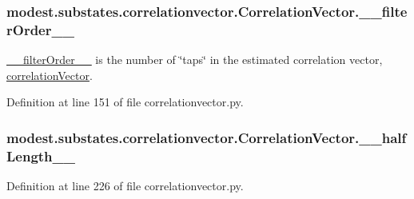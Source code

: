 \subsubsection[{\texorpdfstring{\+\_\+\+\_\+filter\+Order\+\_\+\+\_\+}{__filterOrder__}}]{\setlength{\rightskip}{0pt plus 5cm}modest.\+substates.\+correlationvector.\+Correlation\+Vector.\+\_\+\+\_\+filter\+Order\+\_\+\+\_\+\hspace{0.3cm}{\ttfamily [private]}}\hypertarget{classmodest_1_1substates_1_1correlationvector_1_1CorrelationVector_a6454cf8c143629a28cf684f6abbf4830}{}\label{classmodest_1_1substates_1_1correlationvector_1_1CorrelationVector_a6454cf8c143629a28cf684f6abbf4830}


\hyperlink{classmodest_1_1substates_1_1correlationvector_1_1CorrelationVector_a6454cf8c143629a28cf684f6abbf4830}{\+\_\+\+\_\+filter\+Order\+\_\+\+\_\+} is the number of \char`\"{}taps\char`\"{} in the estimated correlation vector, \hyperlink{classmodest_1_1substates_1_1correlationvector_1_1CorrelationVector_a81da583ee9077067b6aaa354fd8a8c49}{correlation\+Vector}. 



Definition at line 151 of file correlationvector.\+py.

\subsubsection[{\texorpdfstring{\+\_\+\+\_\+half\+Length\+\_\+\+\_\+}{__halfLength__}}]{\setlength{\rightskip}{0pt plus 5cm}modest.\+substates.\+correlationvector.\+Correlation\+Vector.\+\_\+\+\_\+half\+Length\+\_\+\+\_\+\hspace{0.3cm}{\ttfamily [private]}}\hypertarget{classmodest_1_1substates_1_1correlationvector_1_1CorrelationVector_a8eb5fd943e4bf6d3fea306bb15552075}{}\label{classmodest_1_1substates_1_1correlationvector_1_1CorrelationVector_a8eb5fd943e4bf6d3fea306bb15552075}


Definition at line 226 of file correlationvector.\+py.

